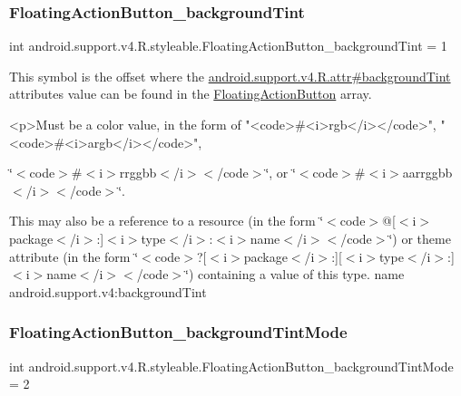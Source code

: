 \subsubsection{\texorpdfstring{Floating\+Action\+Button\+\_\+background\+Tint}{FloatingActionButton\_backgroundTint}}
{\footnotesize\ttfamily int android.\+support.\+v4.\+R.\+styleable.\+Floating\+Action\+Button\+\_\+background\+Tint = 1\hspace{0.3cm}{\ttfamily [static]}}

This symbol is the offset where the \hyperlink{classandroid_1_1support_1_1v4_1_1R_1_1attr_aee5568276e5effa7f9682abb574dbb69}{android.\+support.\+v4.\+R.\+attr\#background\+Tint} attribute\textquotesingle{}s value can be found in the \hyperlink{classandroid_1_1support_1_1v4_1_1R_1_1styleable_ad3363bb32f8e5e0dde36b5e32146816b}{Floating\+Action\+Button} array.

\begin{DoxyVerb}      <p>Must be a color value, in the form of "<code>#<i>rgb</i></code>", "<code>#<i>argb</i></code>",
\end{DoxyVerb}
 \char`\"{}$<$code$>$\#$<$i$>$rrggbb$<$/i$>$$<$/code$>$\char`\"{}, or \char`\"{}$<$code$>$\#$<$i$>$aarrggbb$<$/i$>$$<$/code$>$\char`\"{}. 

This may also be a reference to a resource (in the form \char`\"{}$<$code$>$@\mbox{[}$<$i$>$package$<$/i$>$\+:\mbox{]}$<$i$>$type$<$/i$>$\+:$<$i$>$name$<$/i$>$$<$/code$>$\char`\"{}) or theme attribute (in the form \char`\"{}$<$code$>$?\mbox{[}$<$i$>$package$<$/i$>$\+:\mbox{]}\mbox{[}$<$i$>$type$<$/i$>$\+:\mbox{]}$<$i$>$name$<$/i$>$$<$/code$>$\char`\"{}) containing a value of this type.  name android.\+support.\+v4\+:background\+Tint \mbox{\label{classandroid_1_1support_1_1v4_1_1R_1_1styleable_aee1803929827518ab119257a16d76e6d}} 
\subsubsection{\texorpdfstring{Floating\+Action\+Button\+\_\+background\+Tint\+Mode}{FloatingActionButton\_backgroundTintMode}}
{\footnotesize\ttfamily int android.\+support.\+v4.\+R.\+styleable.\+Floating\+Action\+Button\+\_\+background\+Tint\+Mode = 2\hspace{0.3cm}{\ttfamily [static]}}

